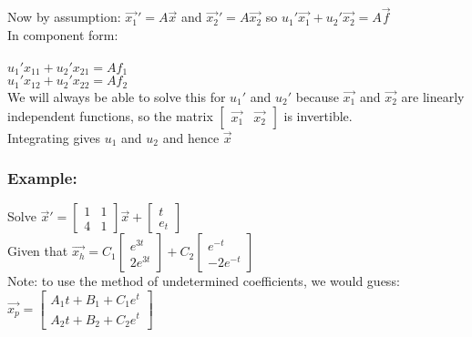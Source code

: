 \documentclass[12pt]{article}
\begin{document}
	Now by assumption: $\overrightarrow{x_1}' = A\overrightarrow{x}$ and $\overrightarrow{x_2}' = A\overrightarrow{x_2}$ so $u_1' \overrightarrow{x_1} + u_2' \overrightarrow{x_2} = A \overrightarrow{f}$\\
	
	In component form:\\\\
	$u_1'x_{11} + u_2'x_{21} = Af_1$\\
	$u_1'x_{12} + u_2'x_{22} = Af_2$\\
	
	We will always be able to solve this for $u_1'$ and $u_2'$ because $\overrightarrow{x_1}$ and $\overrightarrow{x_2}$ are linearly independent functions, so the matrix $\begin{bmatrix}
	\overrightarrow{x_1} & \overrightarrow{x_2}
	\end{bmatrix}$ is invertible.\\
	
	Integrating gives $u_1$ and $u_2$ and hence $\overrightarrow{x}$\\
	
	\subsubsection*{Example:}
	Solve $\overrightarrow{x}' = \begin{bmatrix} 1 & 1 \\ 4 & 1 \end{bmatrix} \overrightarrow{x} + \begin{bmatrix} t \\ e_t \end{bmatrix}$\\
	Given that $\overrightarrow{x_h} = C_1 \begin{bmatrix} e^{3t} \\ 2e^{3t} \end{bmatrix} + C_2 \begin{bmatrix} e^{-t} \\ -2e^{-t} \end{bmatrix}$\\
	
	Note: to use the method of undetermined coefficients, we would guess:\\
	$\overrightarrow{x_p} = \begin{bmatrix} A_1t + B_1 + C_1e^t \\ A_2t + B_2 + C_2e^t \end{bmatrix}$\\
	
\end{document}
